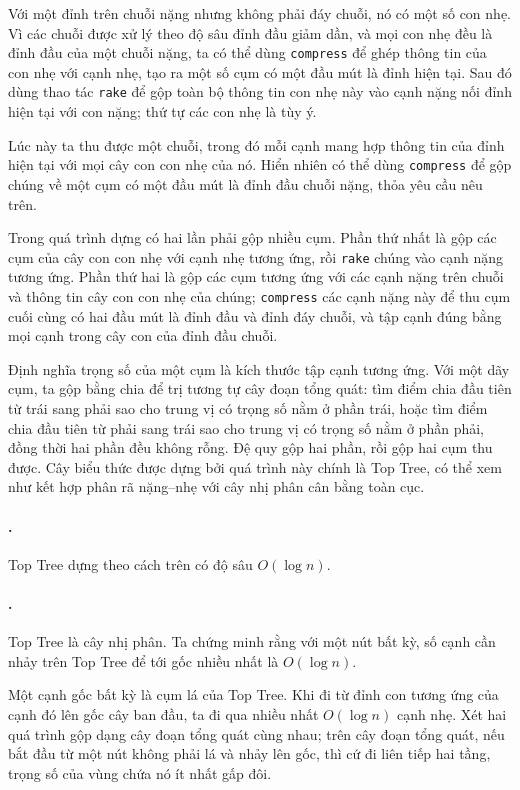 \documentclass[11pt]{article}
\begin{document}
Với một đỉnh trên chuỗi nặng nhưng không phải đáy chuỗi, nó có một số con nhẹ.
Vì các chuỗi được xử lý theo độ sâu đỉnh đầu giảm dần, và mọi con nhẹ đều là
đỉnh đầu của một chuỗi nặng, ta có thể dùng \texttt{compress} để ghép thông
tin của con nhẹ với cạnh nhẹ, tạo ra một số cụm có một đầu mút là đỉnh hiện
tại. Sau đó dùng thao tác \texttt{rake} để gộp toàn bộ thông tin con nhẹ này
vào cạnh nặng nối đỉnh hiện tại với con nặng; thứ tự các con nhẹ là tùy ý.

Lúc này ta thu được một chuỗi, trong đó mỗi cạnh mang hợp thông tin của đỉnh
hiện tại với mọi cây con con nhẹ của nó. Hiển nhiên có thể dùng
\texttt{compress} để gộp chúng về một cụm có một đầu mút là đỉnh đầu chuỗi
nặng, thỏa yêu cầu nêu trên.

Trong quá trình dựng có hai lần phải gộp nhiều cụm. Phần thứ nhất là gộp các
cụm của cây con con nhẹ với cạnh nhẹ tương ứng, rồi \texttt{rake} chúng vào
cạnh nặng tương ứng. Phần thứ hai là gộp các cụm tương ứng với các cạnh nặng
trên chuỗi và thông tin cây con con nhẹ của chúng; \texttt{compress} các cạnh
nặng này để thu cụm cuối cùng có hai đầu mút là đỉnh đầu và đỉnh đáy chuỗi,
và tập cạnh đúng bằng mọi cạnh trong cây con của đỉnh đầu chuỗi.

Định nghĩa trọng số của một cụm là kích thước tập cạnh tương ứng. Với một dãy
cụm, ta gộp bằng chia để trị tương tự cây đoạn tổng quát: tìm điểm chia đầu
tiên từ trái sang phải sao cho trung vị có trọng số nằm ở phần trái, hoặc tìm
điểm chia đầu tiên từ phải sang trái sao cho trung vị có trọng số nằm ở phần
phải, đồng thời hai phần đều không rỗng. Đệ quy gộp hai phần, rồi gộp hai cụm
thu được. Cây biểu thức được dựng bởi quá trình này chính là Top Tree, có thể
xem như kết hợp phân rã nặng--nhẹ với cây nhị phân cân bằng toàn cục.

\paragraph{.}
Top Tree dựng theo cách trên có độ sâu \(O(\log n)\).

\paragraph{.}
Top Tree là cây nhị phân. Ta chứng minh rằng với một nút bất kỳ, số cạnh cần
nhảy trên Top Tree để tới gốc nhiều nhất là \(O(\log n)\).

Một cạnh gốc bất kỳ là cụm lá của Top Tree. Khi đi từ đỉnh con tương ứng của
cạnh đó lên gốc cây ban đầu, ta đi qua nhiều nhất \(O(\log n)\) cạnh nhẹ. Xét
hai quá trình gộp dạng cây đoạn tổng quát cùng nhau; trên cây đoạn tổng quát,
nếu bắt đầu từ một nút không phải lá và nhảy lên gốc, thì cứ đi liên tiếp hai
tầng, trọng số của vùng chứa nó ít nhất gấp đôi.
\end{document}
